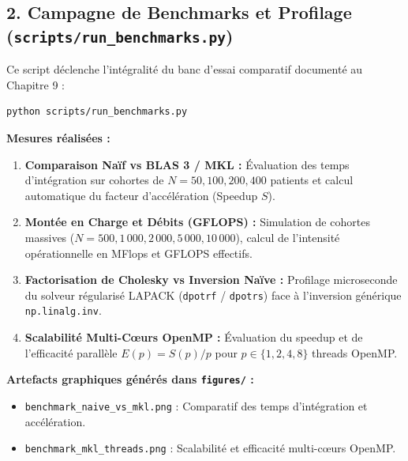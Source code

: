 \documentclass[11pt,a4paper]{report}
\theoremstyle{plain}
\theoremstyle{definition}
\theoremstyle{remark}
\begin{document}
\subsection{2. Campagne de Benchmarks et Profilage (\texttt{scripts/run\_benchmarks.py})}
Ce script déclenche l'intégralité du banc d'essai comparatif documenté au Chapitre 9 :
\begin{lstlisting}[language=bash]
python scripts/run_benchmarks.py
\end{lstlisting}
\textbf{Mesures réalisées :}
\begin{enumerate}
    \item \textbf{Comparaison Naïf vs BLAS 3 / MKL :} Évaluation des temps d'intégration sur cohortes de $N = 50, 100, 200, 400$ patients et calcul automatique du facteur d'accélération (Speedup $S$).
    \item \textbf{Montée en Charge et Débits (GFLOPS) :} Simulation de cohortes massives ($N = 500, 1\,000, 2\,000, 5\,000, 10\,000$), calcul de l'intensité opérationnelle en MFlops et GFLOPS effectifs.
    \item \textbf{Factorisation de Cholesky vs Inversion Naïve :} Profilage microseconde du solveur régularisé LAPACK (\texttt{dpotrf} / \texttt{dpotrs}) face à l'inversion générique \texttt{np.linalg.inv}.
    \item \textbf{Scalabilité Multi-Cœurs OpenMP :} Évaluation du speedup et de l'efficacité parallèle $E(p) = S(p)/p$ pour $p \in \{1, 2, 4, 8\}$ threads OpenMP.
\end{enumerate}
\textbf{Artefacts graphiques générés dans \texttt{figures/} :}
\begin{itemize}
    \item \texttt{benchmark\_naive\_vs\_mkl.png} : Comparatif des temps d'intégration et accélération.
    \item \texttt{benchmark\_mkl\_threads.png} : Scalabilité et efficacité multi-cœurs OpenMP.
\end{itemize}
\end{document}
